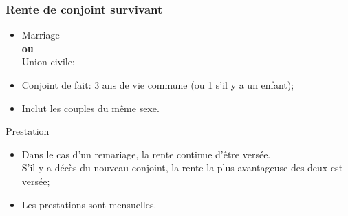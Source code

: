 \documentclass[10pt, french]{article}
\begin{document}
\begin{multicols*}{3}
\subsubsection*{Rente de conjoint survivant}

\begin{definitionNOHFILL}[Conjoint]
\begin{itemize}[leftmargin = *]
	\item	Marriage	\\
			\textbf{ou}\\
			Union civile;
	\item	Conjoint de fait: 3 ans de vie commune (ou 1 s'il y a un enfant);
	\item	Inclut les couples du même sexe.
\end{itemize}
\end{definitionNOHFILL}

\begin{conceptgen}{Prestation}
\begin{itemize}[leftmargin = *]
	\item	Dans le cas d'un remariage, la rente continue d'être versée. \\
			S'il y a décès du nouveau conjoint, la rente la plus avantageuse des deux est versée;
	\item	Les prestations sont mensuelles.
\end{itemize}


\end{conceptgen}
\end{multicols*}
\end{document}
